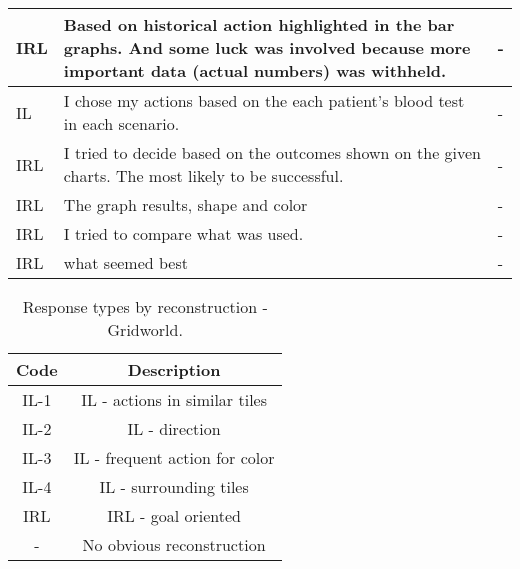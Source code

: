 \documentclass{article}
\begin{document}
\begin{longtable}{ | m{0.6in} | m{5in}| m{0.6in} | }
IRL & Based on historical action highlighted in the bar graphs. And some luck was involved because more important data (actual numbers) was withheld.  & - \\ \hline
IL & I chose my actions based on the each patient's blood test in each scenario.  & - \\ \hline
IRL & I tried to decide based on the outcomes shown on the given charts. The most likely to be successful. & - \\ \hline
IRL & The graph results, shape and color & - \\ \hline
IRL & I tried to compare what was used. & - \\ \hline
IRL & what seemed best & - \\ \hline

 \end{longtable}

\begin{table}[h]
\centering
\begin{tabular}{ |c|c| }
\hline
 Code & Description \\ \hline
 IL-1 & IL - actions in similar tiles \\ 
 IL-2 & IL - direction \\
 IL-3 & IL - frequent action for color \\
 IL-4 & IL - surrounding tiles \\
 IRL  & IRL - goal oriented \\
   -  & No obvious reconstruction \\
 \hline
\end{tabular}
\caption{Response types by reconstruction - Gridworld.
\label{gridworld_response_legend}}
\end{table}
\end{document}

